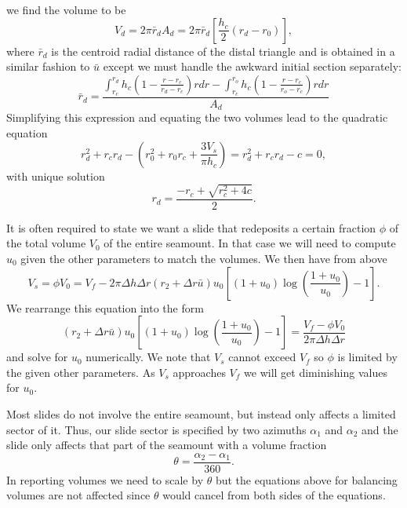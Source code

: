 \documentclass[12pt,letterpaper,margin=0.5in]{report}
\begin{document}
we find the volume to be
\begin{equation}
V_d = 2 \pi \bar{r}_d A_d = 2 \pi \bar{r}_d \left [ \frac{h_c}{2} (r_d - r_0) \right ],
\end{equation}
where $\bar{r}_d$ is the centroid radial distance of the distal triangle and is obtained in a similar fashion to $\bar{u}$ except
we must handle the awkward initial section separately:
\begin{equation}
\bar{r}_d = \frac{\int_{r_c}^{r_d}h_c \left (1 - \frac{r - r_c}{r_d - r_c} \right )rdr - \int_{r_c}^{r_o}h_c \left (1 - \frac{r - r_c}{r_o- r_c} \right )rdr}{A_d}
\end{equation}
Simplifying this expression and equating the two volumes lead to the quadratic equation
\begin{equation}
r_d^2 + r_c r_d - \left (r_0^2 + r_0 r_c + \frac{3 V_s}{\pi h_c}\right ) = r_d^2 + r_c r_d - c = 0,
\end{equation}
with unique solution
\begin{equation}
r_d = \frac{-r_c + \sqrt{r_c^2 + 4c}}{2}.
\end{equation}

It is often required to state we want a slide that redeposits a certain fraction $\phi$ of the total volume $V_0$ of the entire seamount. In that
case we will need to compute $u_0$ given the other parameters to match the volumes.  We then have from above
\begin{equation}
V_s = \phi V_0 = V_f - 2 \pi \Delta h \Delta r \left ( r_2 + \Delta r\bar{u} \right ) u_0 \left [ (1 + u_0) \log \left (\frac{1 + u_0}{u_0} \right ) - 1 \right ].
\end{equation}
We rearrange this equation into the form
\begin{equation}
\left ( r_2 + \Delta r \bar{u} \right ) u_0 \left [ (1 + u_0) \log \left (\frac{1 + u_0}{u_0} \right ) - 1 \right ] = \frac{V_f - \phi V_0}{2 \pi \Delta h \Delta r}
\end{equation}
and solve for $u_0$ numerically.  We note that $V_s$ cannot exceed $V_f$ so $\phi$ is limited by the given other parameters.  As
$V_s$ approaches $V_f$ we will get diminishing values for $u_0$.

Most slides do not involve the entire seamount, but instead only affects a limited sector of it.  Thus, our slide sector is specified by two
azimuths $\alpha_1$ and $\alpha_2$ and the slide only affects that part of the seamount with a volume fraction
\begin{equation}
\theta = \frac{\alpha_2 - \alpha_1}{360}.
\end{equation}
In reporting volumes we need to scale by $\theta$ but the equations above for balancing volumes are not affected since $\theta$ would cancel from both sides of the equations.
\end{document}
